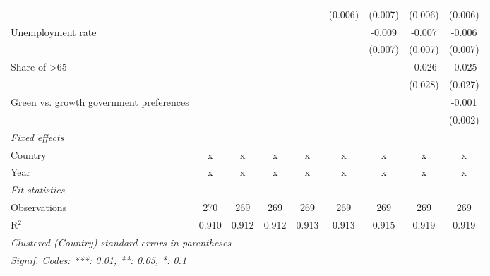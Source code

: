 \begin{table}[htbp]
\begin{tabular}{lcccccccc}
                                                                               &         &         &         &         & (0.006) & (0.007) & (0.006)      & (0.006)\\   
      Unemployment rate                                                        &         &         &         &         &         & -0.009  & -0.007       & -0.006\\   
                                                                               &         &         &         &         &         & (0.007) & (0.007)      & (0.007)\\   
      Share of >65                                                             &         &         &         &         &         &         & -0.026       & -0.025\\   
                                                                               &         &         &         &         &         &         & (0.028)      & (0.027)\\   
      Green vs. growth government preferences                                  &         &         &         &         &         &         &              & -0.001\\   
                                                                               &         &         &         &         &         &         &              & (0.002)\\   
      \emph{Fixed effects}\\
      Country                                                                  & x       & x       & x       & x       & x       & x       & x            & x\\  
      Year                                                                     & x       & x       & x       & x       & x       & x       & x            & x\\  
      \midrule \emph{Fit statistics}\\
      Observations                                                             & 270     & 269     & 269     & 269     & 269     & 269     & 269          & 269\\  
      R$^2$                                                                    & 0.910   & 0.912   & 0.912   & 0.913   & 0.913   & 0.915   & 0.919        & 0.919\\  
      \midrule
      \multicolumn{9}{l}{\emph{Clustered (Country) standard-errors in parentheses}}\\
      \multicolumn{9}{l}{\emph{Signif. Codes: ***: 0.01, **: 0.05, *: 0.1}}\\
   \end{tabular}
\end{table}


